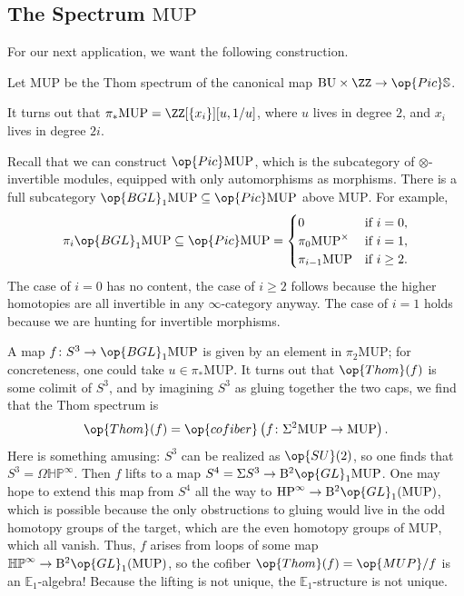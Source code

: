 \documentclass[../notes.tex]{subfiles}
\begin{document}
\subsection{The Spectrum \texorpdfstring{$\mathrm{MUP}$}{ MUP}}
For our next application, we want the following construction.
\begin{definition}
	Let $\mathrm{MUP}$ be the Thom spectrum of the canonical map $\mathrm{BU}\times\ZZ\to\op{Pic}\mathbb S$.
\end{definition}
\begin{remark}
	It turns out that $\pi_*\mathrm{MUP}=\ZZ[\{x_i\}][u,1/u]$, where $u$ lives in degree $2$, and $x_i$ lives in degree $2i$.
\end{remark}
Recall that we can construct $\op{Pic}\mathrm{MUP}$, which is the subcategory of $\otimes$-invertible modules, equipped with only automorphisms as morphisms. There is a full subcategory $\op{BGL}_1\mathrm{MUP}\subseteq\op{Pic}\mathrm{MUP}$ above $\mathrm{MUP}$. For example,
\[\pi_i\op{BGL}_1\mathrm{MUP}\subseteq\op{Pic}\mathrm{MUP}=\begin{cases}
	0 & \text{if }i=0, \\
	\pi_0\mathrm{MUP}^\times & \text{if }i=1, \\
	\pi_{i-1}\mathrm{MUP} & \text{if }i\ge2.
\end{cases}\]
The case of $i=0$ has no content, the case of $i\ge2$ follows because the higher homotopies are all invertible in any $\infty$-category anyway. The case of $i=1$ holds because we are hunting for invertible morphisms.
\begin{example}
	A map $f\colon S^3\to\op{BGL}_1\mathrm{MUP}$ is given by an element in $\pi_2\mathrm{MUP}$; for concreteness, one could take $u\in\pi_*\mathrm{MUP}$. It turns out that $\op{Thom}(f)$ is some colimit of $S^3$, and by imagining $S^3$ as gluing together the two caps, we find that the Thom spectrum is
	\[\op{Thom}(f)=\op{cofiber}\left(f\colon\Sigma^2\mathrm{MUP}\to\mathrm{MUP}\right).\]
	Here is something amusing: $S^3$ can be realized as $\op{SU}(2)$, so one finds that $S^3=\Omega\mathbb{HP}^\infty$. Then $f$ lifts to a map $S^4=\Sigma S^3\to\mathrm B^2\op{GL}_1\mathrm{MUP}$. One may hope to extend this map from $S^4$ all the way to $\mathrm{HP}^\infty\to\mathrm B^2\op{GL}_1(\mathrm{MUP})$, which is possible because the only obstructions to gluing would live in the odd homotopy groups of the target, which are the even homotopy groups of $\mathrm{MUP}$, which all vanish. Thus, $f$ arises from loops of some map $\mathbb{HP}^\infty\to\mathrm B^2\op{GL}_1(\mathrm{MUP})$, so the cofiber $\op{Thom}(f)=\op{MUP}/f$ is an $\mathbb E_1$-algebra! Because the lifting is not unique, the $\mathbb E_1$-structure is not unique.
\end{example}
\end{document}

